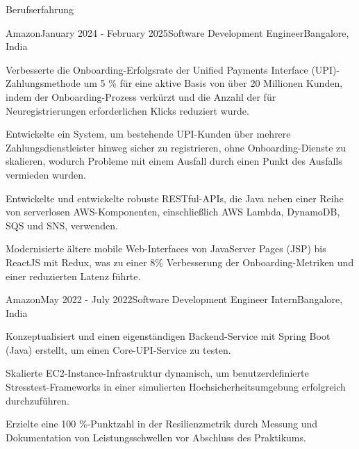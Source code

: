 \documentclass{resume} %
\begin{document}
\begin{rSection}{Berufserfahrung}
    \begin{rSubsection}{Amazon}{January 2024 - February 2025}{Software Development Engineer}{Bangalore, India}
        \item Verbesserte die Onboarding-Erfolgsrate der Unified Payments Interface (UPI)-Zahlungsmethode um 5 \% für eine aktive Basis von über 20 Millionen Kunden, indem der Onboarding-Prozess verkürzt und die Anzahl der für Neuregistrierungen erforderlichen Klicks reduziert wurde.
        \item Entwickelte ein System, um bestehende UPI-Kunden über mehrere Zahlungsdienstleister hinweg sicher zu registrieren, ohne Onboarding-Dienste zu skalieren, wodurch Probleme mit einem Ausfall durch einen Punkt des Ausfalls vermieden wurden.
        \item Entwickelte und entwickelte robuste RESTful-APIs, die Java neben einer Reihe von serverlosen AWS-Komponenten, einschließlich AWS Lambda, DynamoDB, SQS und SNS, verwenden.
        \item Modernisierte ältere mobile Web-Interfaces von JavaServer Pages (JSP) bis ReactJS mit Redux, was zu einer 8\% Verbesserung der Onboarding-Metriken und einer reduzierten Latenz führte.
    \end{rSubsection}

    \begin{rSubsection}{Amazon}{May 2022 - July 2022}{Software Development Engineer Intern}{Bangalore, India}
        \item Konzeptualisiert und einen eigenständigen Backend-Service mit Spring Boot (Java) erstellt, um einen Core-UPI-Service zu testen.
        \item Skalierte EC2-Instance-Infrastruktur dynamisch, um benutzerdefinierte Stresstest-Frameworks in einer simulierten Hochsicherheitsumgebung erfolgreich durchzuführen.
        \item Erzielte eine 100 \%-Punktzahl in der Resilienzmetrik durch Messung und Dokumentation von Leistungsschwellen vor Abschluss des Praktikums.
    \end{rSubsection}
    
\end{rSection}

\end{document}

